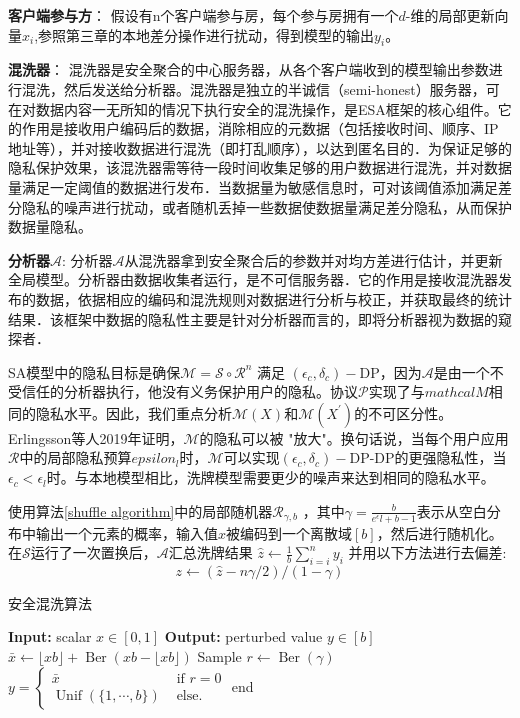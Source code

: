 \textbf{客户端参与方}：
假设有n个客户端参与房，每个参与房拥有一个$d$-维的局部更新向量$x_{i}$,参照第三章的本地差分操作进行扰动，得到模型的输出$y_{i}$。

\textbf{混洗器}：
混洗器是安全聚合的中心服务器，从各个客户端收到的模型输出参数进行混洗，然后发送给分析器。混洗器是独立的半诚信（semi-honest）服务器，可在对数据内容一无所知的情况下执行安全的混洗操作，是ESA框架的核心组件。它的作用是接收用户编码后的数据，消除相应的元数据（包括接收时间、顺序、IP地址等），并对接收数据进行混洗（即打乱顺序），以达到匿名目的．为保证足够的隐私保护效果，该混洗器需等待一段时间收集足够的用户数据进行混洗，并对数据量满足一定阈值的数据进行发布．当数据量为敏感信息时，可对该阈值添加满足差分隐私的噪声进行扰动，或者随机丢掉一些数据使数据量满足差分隐私\cite{ref47}，从而保护数据量隐私。

\textbf{分析器$\mathcal{A}$}:
分析器$\mathcal{A}$从混洗器拿到安全聚合后的参数并对均方差进行估计，并更新全局模型。分析器由数据收集者运行，是不可信服务器．它的作用是接收混洗器发布的数据，依据相应的编码和混洗规则对数据进行分析与校正，并获取最终的统计结果．该框架中数据的隐私性主要是针对分析器而言的，即将分析器视为数据的窥探者． 


SA模型中的隐私目标是确保$\mathcal{M}=\mathcal{S} \circ \mathcal{R}^{n}$ 满足 $\left(\epsilon_{c}, \delta_{c}\right)-\mathrm{DP}$，因为$\mathcal{A}$是由一个不受信任的分析器执行，他没有义务保护用户的隐私。协议$\mathcal{P}$实现了与$mathcal{M}$相同的隐私水平。因此，我们重点分析$\mathcal{M}(X)$和$\mathcal{M}\left(X^{\prime}\right)$的不可区分性。Erlingsson等人2019年证明，$\mathcal{M}$的隐私可以被 "放大"。换句话说，当每个用户应用$\mathcal{R}$中的局部隐私预算$epsilon_{l}$时，$\mathcal{M}$可以实现$\left(\epsilon_{c}, \delta_{c}\right)-\mathrm{DP}$-DP的更强隐私性，当$\epsilon_{c}<\epsilon_{l}$时。与本地模型相比，洗牌模型需要更少的噪声来达到相同的隐私水平。

使用算法\ref{shuffle algorithm}中的局部随机器$\mathcal{R}_{\gamma, b}$ ，其中$\gamma=\frac{b}{e^{\epsilon} l+b-1}$表示从空白分布中输出一个元素的概率，输入值$x$被编码到一个离散域$[b]$，然后进行随机化。在$\mathcal{S}$运行了一次置换后，$\mathcal{A}$汇总洗牌结果 $\hat{z} \leftarrow \frac{1}{b} \sum_{i=i}^{n} y_{i}$ 并用以下方法进行去偏差:
\begin{equation}\label{eq:shuffle去偏差}
z \leftarrow(\hat{z}-n \gamma / 2) /(1-\gamma)
\end{equation}

\begin{algorithm}[!htb]
  \caption{安全混洗算法}
  \label{shuffle algorithm}
  \begin{algorithmic}[1]
    \footnotesize
    \STATE \textbf{Input:} scalar $x \in[0,1]$
    \STATE \textbf{Output:} perturbed value $y \in[b]$
      \STATE $\bar{x} \leftarrow\lfloor x b\rfloor+\operatorname{Ber}(x b-\lfloor x b\rfloor)$
      \STATE Sample $r \leftarrow \operatorname{Ber}(\gamma)$
      \STATE $y=\left\{\begin{array}{ll}\bar{x} & \text { if } r=0 \\ \operatorname{Unif}(\{1, \cdots, b\}) & \text { else. }\end{array}\right.$
    \STATE end
  \end{algorithmic}
\end{algorithm}

